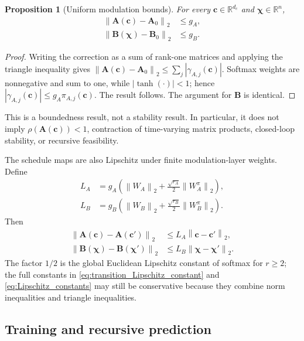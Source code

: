 ﻿\documentclass[journal]{IEEEtran}
\newtheorem{proposition}{Proposition}
\newcommand{\vc}{\mathbf{c}}
\newcommand{\vchi}{\boldsymbol{\chi}}
\newcommand{\mA}{\mathbf{A}}
\newcommand{\mB}{\mathbf{B}}
\newcommand{\R}{\mathbb{R}}
\newcommand{\norm}[1]{\left\lVert #1\right\rVert}
\begin{document}
\begin{proposition}[Uniform modulation bounds]
\label{prop:modulation_bound}
For every $\vc\in\R^{d_c}$ and $\vchi\in\R^n$,
\begin{equation}
    \begin{aligned}
    \norm{\mA(\vc)-\mA_0}_2&\le g_A,\\
    \norm{\mB(\vchi)-\mB_0}_2&\le g_B.
    \end{aligned}
    \label{eq:modulation_bound}
\end{equation}
\end{proposition}
\begin{proof}
Writing the correction as a sum of rank-one matrices and applying the triangle inequality gives
$\norm{\mA(\vc)-\mA_0}_2\le\sum_j|\gamma_{A,j}(\vc)|$. Softmax weights are nonnegative and sum to one, while $|\tanh(\cdot)|<1$; hence $|\gamma_{A,j}(\vc)|\le g_A\pi_{A,j}(\vc)$. The result follows. The argument for $\mB$ is identical.
\end{proof}

This is a boundedness result, not a stability result. In particular, it does not imply $\rho(\mA(\vc))<1$, contraction of time-varying matrix products, closed-loop stability, or recursive feasibility.

The schedule maps are also Lipschitz under finite modulation-layer weights. Define
\begin{align}
    L_A&=g_A\left(\norm{W_A}_2+\frac{\sqrt{r_A}}{2}\norm{W_A^\pi}_2\right),
    \label{eq:transition_Lipschitz_constant}\\
    L_B&=g_B\left(\norm{W_B}_2+\frac{\sqrt{r_B}}{2}\norm{W_B^\pi}_2\right).
    \label{eq:Lipschitz_constants}
\end{align}
Then
\begin{equation}
    \begin{aligned}
    \norm{\mA(\vc)-\mA(\vc')}_2&\le L_A\norm{\vc-\vc'}_2,\\
    \norm{\mB(\vchi)-\mB(\vchi')}_2&\le L_B\norm{\vchi-\vchi'}_2.
    \end{aligned}
    \label{eq:schedule_lipschitz}
\end{equation}
The factor $1/2$ is the global Euclidean Lipschitz constant of softmax for $r\ge2$; the full constants in \eqref{eq:transition_Lipschitz_constant} and \eqref{eq:Lipschitz_constants} may still be conservative because they combine norm inequalities and triangle inequalities.

\subsection{Training and recursive prediction}
\end{document}
